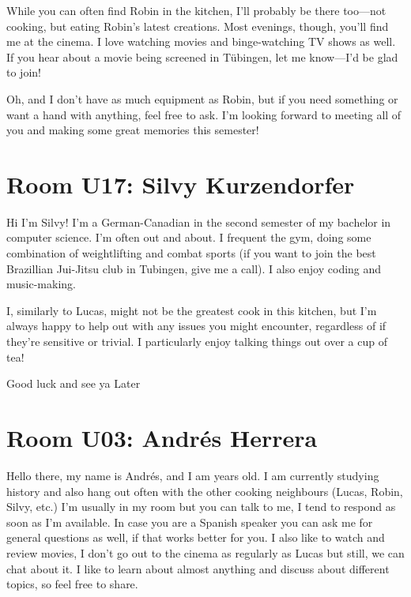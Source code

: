 While you can often find Robin in the kitchen, I’ll probably be there too—not cooking, but eating Robin’s latest creations. Most evenings, though, you’ll find me at the cinema. I love watching movies and binge-watching TV shows as well. If you hear about a movie being screened in Tübingen, let me know—I’d be glad to join!  

Oh, and I don’t have as much equipment as Robin, but if you need something or want a hand with anything, feel free to ask. I’m looking forward to meeting all of you and making some great memories this semester!

\section{Room U17: Silvy Kurzendorfer} \label{sec:silvyK}
%
\FPsub\result{\theCurrentDate}{\theBirthdate}
\FPdiv{}
\FPtrunc{}

Hi I'm Silvy! I'm a German-Canadian in the second semester of my bachelor in computer science. I'm often out and about. I frequent the gym, doing some combination of weightlifting and combat sports (if you want to join the best Brazillian Jui-Jitsu club in Tubingen, give me a call). I also enjoy coding and music-making. 

I, similarly to Lucas, might not be the greatest cook in this kitchen, but I'm always happy to help out with any issues you might encounter, regardless of if they're sensitive or trivial. I particularly enjoy talking things out over a cup of tea!

Good luck and see ya Later

\section{Room U03: Andrés Herrera} \label{sec:andresH}
%
\FPsub\result{\theCurrentDate}{\theBirthdate}
\FPdiv{}
\FPtrunc{}

Hello there, my name is Andrés, and I am \myage{} years old. I am currently studying history and also hang out often with the other cooking neighbours (Lucas, Robin, Silvy, etc.) I’m usually in my room but you can talk to me, I tend to respond as soon as I’m available. In case you are a Spanish speaker you can ask me for general questions as well, if that works better for you. I also like to watch and review movies, I don’t go out to the cinema as regularly as Lucas but still, we can chat about it. I like to learn about almost anything and discuss about different topics, so feel free to share.


